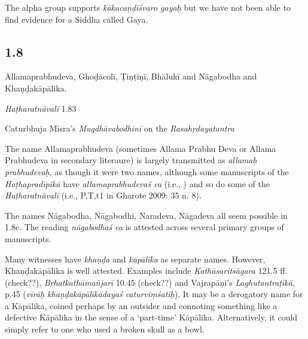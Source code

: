 \begin{ekdosis}
\begin{philcomm}[hp01_007]
The alpha group supports \emph{kākacaṇḍīśvaro gayaḥ} but we have not been able to find evidence for a Siddha called Gaya.
\end{philcomm}

\subsection*{1.8}
\begin{translation}[hp01_008]
Allamaprabhudeva, Ghoḍācolī, Ṭiṇṭiṇī, Bhālukī and Nāgabodha and Khaṇḍakāpālika.
\end{translation}

\begin{testimonia}[hp01_008]
\emph{Haṭharatnāvalī} 1.83

\begin{versinnote}
\tl{\var{allamaḥ prabhudevaś ] allamaprabhudevaś P,T,t1}\\!}
\end{versinnote}

Caturbhuja Misra's \emph{Mugdhāvabodhinī} on the \emph{Rasahṛdayatantra}

\begin{versinnote}
\end{versinnote}

\end{testimonia}

\begin{philcomm}[hp01_008]  
The name Allamaprabhudeva (sometimes Allama Prabhu Deva or Allama Prabhudeva in secondary literaure) is largely transmitted as \emph{allamaḥ prabhu\-devaḥ}, as though it were two names, although some manuscripts of the \emph{Haṭha\-pradīpikā} have \emph{allamaprabhudevaś ca} (i.e., ) and so do some of the \emph{Haṭharatnāvalī} (i.e., P,T,t1 in Gharote 2009: 35 n. 8).

The names Nāgabodha, Nāgabodhi, Naradeva, Nāgadeva all seem possible in 1.8c. The reading \emph{nāgabodhaś ca} is attested across several primary groups of manuscripts.

Many witnesses have \emph{khaṇḍa} and \emph{kāpālika} as separate names. However, Khaṇḍa\-kāpālika is well attested. Examples include \emph{Kathāsaritsāgara} 121.5 ff. (check??), \emph{Bṛhatkathāmañjarī} 10.45 (check??) and Vajrapāṇi’s \emph{Laghutantraṭīkā}, p.45 (\emph{vīrāḥ khaṇḍakāpālikādayaś caturviṃśatiḥ}). It may be a derogatory name for a Kāpālika, coined perhaps by an outsider and connoting something like a defective Kāpālika in the sense of a ‘part-time’ Kāpālika. Alternatively, it could simply refer to one who used a broken skull as a bowl.
\end{philcomm}


\end{ekdosis}

